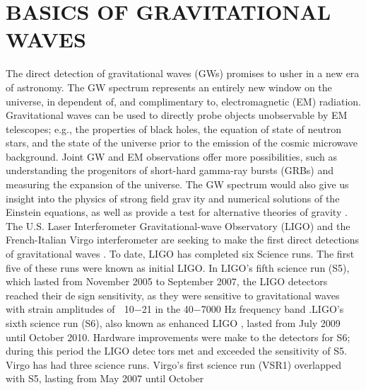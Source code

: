 
\chapter{BASICS OF GRAVITATIONAL WAVES}

The direct detection of gravitational waves (GWs) promises to usher in a new era of astronomy. The GW spectrum represents an entirely new window on the universe, independent of, and complimentary to, electromagnetic (EM) radiation. Gravitational waves can be used to directly probe objects unobservable by EM telescopes; e.g., the properties of black holes, the equation of state of neutron stars, and the state of the universe prior to the emission of the cosmic microwave background. Joint GW and EM observations offer more possibilities, such as understanding the progenitors of short-hard gamma-ray bursts (GRBs) and measuring the expansion of the universe. The GW spectrum would also give us insight into the physics of strong field gravity and numerical solutions of the Einstein equations, as well as provide a test for alternative theories of gravity . The U.S. Laser Interferometer Gravitational-wave Observatory (LIGO) and the French-Italian Virgo interferometer are seeking to make the first direct detections of gravitational waves . To date, LIGO has completed six Science runs. The first five of these runs were known as initial LIGO. In LIGO’s fifth science run (S5), which lasted from November 2005 to September 2007, the LIGO detectors reached their design sensitivity, as they were sensitive to gravitational waves with strain amplitudes of ∼ 10−21 in the 40−7000 Hz frequency band .LIGO’s sixth science run (S6), also known as enhanced LIGO , lasted from July 2009 until October 2010. Hardware improvements were make to the detectors for S6; during this period the LIGO detectors met and exceeded the sensitivity of S5. Virgo has had three science runs. Virgo’s first science run (VSR1) overlapped with S5, lasting from May 2007 until October


